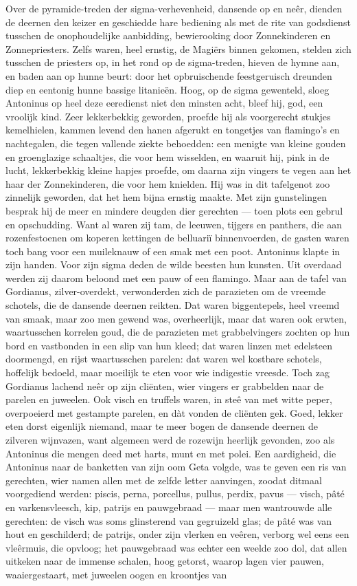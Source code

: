 \documentclass[a4paper, 12pt, oneside, dutch]{article}
\begin{document}
Over de pyramide-treden der sigma-verhevenheid, dansende op en neêr, dienden de deernen den keizer en geschiedde hare bediening als met de rite van godsdienst tusschen de onophoudelijke aanbidding, bewierooking door Zonnekinderen en Zonnepriesters. Zelfs waren, heel ernstig, de Magiërs binnen gekomen, stelden zich tusschen de priesters op, in het rond op de sigma-treden, hieven de hymne aan, en baden aan op hunne beurt: door het opbruischende feestgeruisch dreunden diep en eentonig hunne bassige litanieën. Hoog, op de sigma gewenteld, sloeg Antoninus op heel deze eeredienst niet den minsten acht, bleef hij, god, een vroolijk kind. Zeer lekkerbekkig geworden, proefde hij als voorgerecht stukjes kemelhielen, kammen levend den hanen afgerukt en tongetjes van flamingo's en nachtegalen, die tegen vallende ziekte behoedden: een menigte van kleine gouden en groenglazige schaaltjes, die voor hem wisselden, en waaruit hij, pink in de lucht, lekkerbekkig kleine hapjes proefde, om daarna zijn vingers te vegen aan het haar der Zonnekinderen, die voor hem knielden. Hij was in dit tafelgenot zoo zinnelijk geworden, dat het hem bijna ernstig maakte. Met zijn gunstelingen besprak hij de meer en mindere deugden dier gerechten --- toen plots een gebrul en opschudding. Want al waren zij tam, de leeuwen, tijgers en panthers, die aan rozenfestoenen om koperen kettingen de belluariï binnenvoerden, de gasten waren toch bang voor een muileknauw of een smak met een poot. Antoninus klapte in zijn handen. Voor zijn sigma deden de wilde beesten hun kunsten. Uit overdaad werden zij daarom beloond met een pauw of een flamingo. Maar aan de tafel van Gordianus, zilver-overdekt, verwonderden zich de parazieten om de vreemde schotels, die de dansende deernen reikten. Dat waren biggentepels, heel vreemd van smaak, maar zoo men gewend was, overheerlijk, maar dat waren ook erwten, waartusschen korrelen goud, die de parazieten met grabbelvingers zochten op hun bord en vastbonden in een slip van hun kleed; dat waren linzen met edelsteen doormengd, en rijst waartusschen parelen: dat waren wel kostbare schotels, hoffelijk bedoeld, maar moeilijk te eten voor wie indigestie vreesde. Toch zag Gordianus lachend neêr op zijn cliënten, wier vingers er grabbelden naar de parelen en juweelen. Ook visch en truffels waren, in steê van met witte peper, overpoeierd met gestampte parelen, en dàt vonden de cliënten gek. Goed, lekker eten dorst eigenlijk niemand, maar te meer bogen de dansende deernen de zilveren wijnvazen, want algemeen werd de rozewijn heerlijk gevonden, zoo als Antoninus die mengen deed met harts, munt en met polei. Een aardigheid, die Antoninus naar de banketten van zijn oom Geta volgde, was te geven een ris van gerechten, wier namen allen met de zelfde letter aanvingen, zoodat ditmaal voorgediend werden: piscis, perna, porcellus, pullus, perdix, pavus --- visch, pâté en varkensvleesch, kip, patrijs en pauwgebraad --- maar men wantrouwde alle gerechten: de visch was soms glinsterend van gegruizeld glas; de pâté was van hout en geschilderd; de patrijs, onder zijn vlerken en veêren, verborg wel eens een vleêrmuis, die opvloog; het pauwgebraad was echter een weelde zoo dol, dat allen uitkeken naar de immense schalen, hoog getorst, waarop lagen vier pauwen, waaiergestaart, met juweelen oogen en kroontjes van 
\end{document}
